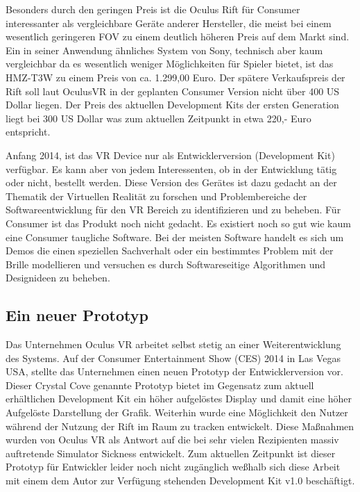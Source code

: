 \documentclass[pagesize, paper=a4, fontsize=12pt,titlepage=true, headings=small, headnosepline, abstractoff, liststotoc, nochapterprefix, plainheadsepline]{scrreprt}
\begin{document}
Besonders durch den geringen Preis ist die Oculus Rift für Consumer interessanter als vergleichbare Geräte anderer Hersteller, die meist bei einem wesentlich geringeren FOV zu einem deutlich höheren Preis auf dem Markt sind. Ein in seiner Anwendung ähnliches System von Sony, technisch aber kaum vergleichbar da es wesentlich weniger Möglichkeiten für Spieler bietet, ist das HMZ-T3W zu einem Preis von ca. 1.299,00 Euro. Der spätere Verkaufspreis der Rift soll laut OculusVR in der geplanten Consumer Version nicht über 400 US Dollar liegen. Der Preis des aktuellen Development Kits der ersten Generation liegt bei 300 US Dollar was zum aktuellen Zeitpunkt in etwa 220,- Euro entspricht.

Anfang 2014, ist das VR Device nur als Entwicklerversion (Development Kit) verfügbar. Es kann aber von jedem Interessenten, ob in der Entwicklung tätig oder nicht, bestellt werden. Diese Version des Gerätes ist dazu gedacht an der Thematik der Virtuellen Realität zu forschen und Problembereiche der Softwareentwicklung für den VR Bereich zu identifizieren und zu beheben. Für Consumer ist das Produkt noch nicht gedacht. Es existiert noch so gut wie kaum eine Consumer taugliche Software. Bei der meisten Software handelt es sich um Demos die einen speziellen Sachverhalt oder ein bestimmtes Problem mit der Brille modellieren und versuchen es durch Softwareseitige Algorithmen und Designideen zu beheben.

\subsection{Ein neuer Prototyp}
Das Unternehmen Oculus VR arbeitet selbst stetig an einer Weiterentwicklung des Systems. Auf der Consumer Entertainment Show (CES) 2014 in Las Vegas USA, stellte das Unternehmen einen neuen Prototyp der Entwicklerversion vor. Dieser Crystal Cove genannte Prototyp bietet im Gegensatz zum aktuell erhältlichen Development Kit ein höher aufgelöstes Display und damit eine höher Aufgelöste Darstellung der Grafik. Weiterhin wurde eine Möglichkeit den Nutzer während der Nutzung der Rift im Raum zu tracken entwickelt. Diese Maßnahmen wurden von Oculus VR als Antwort auf die bei sehr vielen Rezipienten massiv auftretende Simulator Sickness entwickelt. Zum aktuellen Zeitpunkt ist dieser Prototyp für Entwickler leider noch nicht zugänglich weßhalb sich diese Arbeit mit einem dem Autor zur Verfügung stehenden Development Kit v1.0 beschäftigt.
\end{document}
